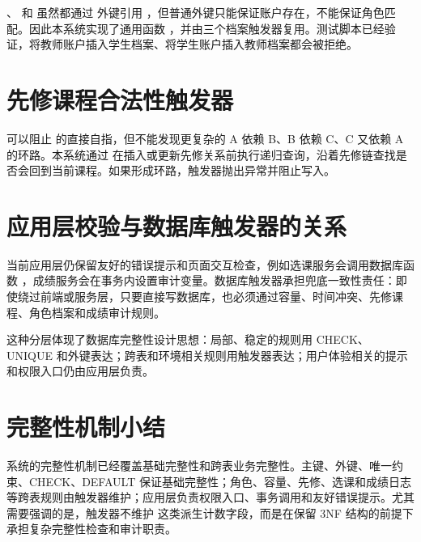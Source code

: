 、 和  虽然都通过  外键引用 ，但普通外键只能保证账户存在，不能保证角色匹配。因此本系统实现了通用函数 ，并由三个档案触发器复用。测试脚本已经验证，将教师账户插入学生档案、将学生账户插入教师档案都会被拒绝。

\section{先修课程合法性触发器}

 可以阻止  的直接自指，但不能发现更复杂的 A 依赖 B、B 依赖 C、C 又依赖 A 的环路。本系统通过  在插入或更新先修关系前执行递归查询，沿着先修链查找是否会回到当前课程。如果形成环路，触发器抛出异常并阻止写入。

\section{应用层校验与数据库触发器的关系}

当前应用层仍保留友好的错误提示和页面交互检查，例如选课服务会调用数据库函数 ，成绩服务会在事务内设置审计变量。数据库触发器承担兜底一致性责任：即使绕过前端或服务层，只要直接写数据库，也必须通过容量、时间冲突、先修课程、角色档案和成绩审计规则。

这种分层体现了数据库完整性设计思想：局部、稳定的规则用 CHECK、UNIQUE 和外键表达；跨表和环境相关规则用触发器表达；用户体验相关的提示和权限入口仍由应用层负责。

\section{完整性机制小结}

系统的完整性机制已经覆盖基础完整性和跨表业务完整性。主键、外键、唯一约束、CHECK、DEFAULT 保证基础完整性；角色、容量、先修、选课和成绩日志等跨表规则由触发器维护；应用层负责权限入口、事务调用和友好错误提示。尤其需要强调的是，触发器不维护  这类派生计数字段，而是在保留 3NF 结构的前提下承担复杂完整性检查和审计职责。
